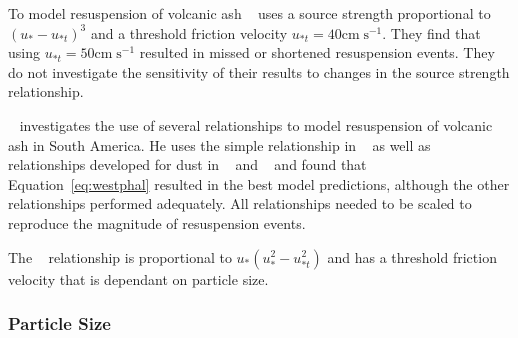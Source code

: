 \documentclass[draft]{agujournal2018}
\begin{document}
To model resuspension of volcanic ash ~\cite{Leadbetter12} uses a source strength proportional to
$(u_{*}-u_{*t})^{3}$ and a threshold friction velocity $u_{*t} = 40 \mathrm{cm} \; \mathrm{s}^{-1}$. 
They find that using $u_{*t} = 50 \mathrm{cm} \; \mathrm{s}^{-1}$ resulted in missed or shortened resuspension events. 
They do not investigate the sensitivity of their results to changes in
the source strength relationship.

~\cite{Folch14} investigates the use of several relationships to model resuspension of volcanic ash in South America.
He uses the simple relationship in ~\cite{westphal} as well as relationships developed for dust in ~\cite{Marticorena97} and
~\cite{Shao93} and found that Equation~\ref{eq:westphal} resulted in the best model predictions, although the other
relationships performed adequately. All relationships needed to be scaled to reproduce the magnitude of resuspension events.

The ~\cite{Marticorena97} relationship is proportional to $u_*(u_*^2 -u_{*t}^2)$ and has a threshold friction velocity
that is dependant on particle size. 



%


\subsubsection{Particle Size}
\end{document}
